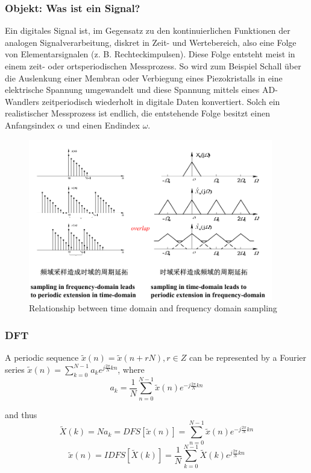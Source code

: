 \subsubsection{Objekt: Was ist ein Signal?}

Ein digitales Signal ist, im Gegensatz zu den kontinuierlichen Funktionen der analogen Signalverarbeitung, diskret in Zeit- und Wertebereich, also eine Folge von Elementarsignalen (z. B. Rechteckimpulsen). Diese Folge entsteht meist in einem zeit- oder ortsperiodischen Messprozess. So wird zum Beispiel Schall über die Auslenkung einer Membran oder Verbiegung eines Piezokristalls in eine elektrische Spannung umgewandelt und diese Spannung mittels eines AD-Wandlers zeitperiodisch wiederholt in digitale Daten konvertiert. Solch ein realistischer Messprozess ist endlich, die entstehende Folge besitzt einen Anfangsindex $\alpha$ und einen Endindex $\omega$.

\begin{figure}
  \centering
  \includegraphics[width=4.2in]{fig/dsp_relationship.png}
  \caption{Relationship between time domain and frequency domain sampling}\label{fig_dsp_sampling}
\end{figure}

\subsubsection{DFT}
A periodic sequence $\tilde{x}(n)=\tilde{x}(n+rN), r\in Z$ can be represented by a Fourier series $\tilde{x}(n)=\displaystyle{\sum_{k=0}^{N-1}a_ke^{j\frac{2\pi}{N}kn}}$, where
$$a_k = \frac{1}{N}\displaystyle{\sum_{n=0}^{N-1}\tilde{x}(n)e^{-j\frac{2\pi}{N}kn}}$$

and thus
$$\tilde{X}(k)=Na_k=DFS[\tilde{x}(n)]=\displaystyle{\sum_{n=0}^{N-1}\tilde{x}(n)e^{-j\frac{2\pi}{N}kn}}$$
$$\tilde{x}(n)=IDFS[\tilde{X}(k)]=\frac{1}{N}\displaystyle{\sum_{k=0}^{N-1}\tilde{X}(k)e^{j\frac{2\pi}{N}kn}}$$


